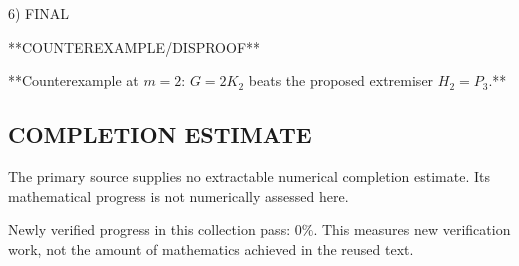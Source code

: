 6) FINAL

**COUNTEREXAMPLE/DISPROOF**

**Counterexample at $m=2$: $G=2K_2$ beats the proposed extremiser $H_2=P_3$.**



\subsection*{COMPLETION ESTIMATE}
The primary source supplies no extractable numerical completion estimate. Its mathematical progress is not numerically assessed here.

Newly verified progress in this collection pass: $0\%$. This measures new verification work, not the amount of mathematics achieved in the reused text.
